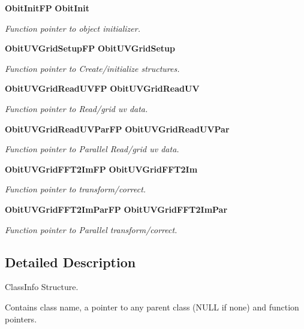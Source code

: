 \begin{CompactItemize}
{\bf Obit\-Init\-FP} {\bf Obit\-Init}
\begin{CompactList}\small\item\em Function pointer to object initializer. \item\end{CompactList}\item 
{\bf Obit\-UVGrid\-Setup\-FP} {\bf Obit\-UVGrid\-Setup}
\begin{CompactList}\small\item\em Function pointer to Create/initialize structures. \item\end{CompactList}\item 
{\bf Obit\-UVGrid\-Read\-UVFP} {\bf Obit\-UVGrid\-Read\-UV}
\begin{CompactList}\small\item\em Function pointer to Read/grid uv data. \item\end{CompactList}\item 
{\bf Obit\-UVGrid\-Read\-UVPar\-FP} {\bf Obit\-UVGrid\-Read\-UVPar}
\begin{CompactList}\small\item\em Function pointer to Parallel Read/grid uv data. \item\end{CompactList}\item 
{\bf Obit\-UVGrid\-FFT2Im\-FP} {\bf Obit\-UVGrid\-FFT2Im}
\begin{CompactList}\small\item\em Function pointer to transform/correct. \item\end{CompactList}\item 
{\bf Obit\-UVGrid\-FFT2Im\-Par\-FP} {\bf Obit\-UVGrid\-FFT2Im\-Par}
\begin{CompactList}\small\item\em Function pointer to Parallel transform/correct. \item\end{CompactList}\end{CompactItemize}


\subsection{Detailed Description}
Class\-Info Structure. 

Contains class name, a pointer to any parent class (NULL if none) and function pointers. 



